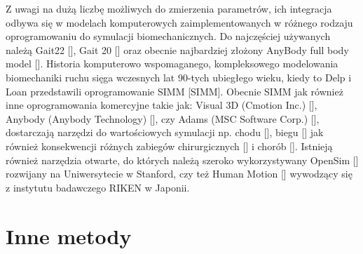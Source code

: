 Z uwagi na dużą liczbę możliwych do zmierzenia parametrów, ich integracja odbywa się w modelach komputerowych zaimplementowanych w różnego rodzaju oprogramowaniu do symulacji biomechanicznych. Do najczęściej używanych należą Gait22 [], Gait 20 [] oraz obecnie najbardziej złożony AnyBody full body model []. Historia komputerowo wspomaganego, kompleksowego modelowania biomechaniki ruchu sięga wczesnych lat 90-tych ubiegłego wieku, kiedy to Delp i Loan przedstawili oprogramowanie SIMM [SIMM]. Obecnie SIMM jak również inne oprogramowania komercyjne takie jak: Visual 3D (Cmotion Inc.) [], Anybody (Anybody Technology) [], czy Adams (MSC Software Corp.) [], dostarczają narzędzi do wartościowych symulacji np. chodu [], biegu [] jak również konsekwencji różnych zabiegów chirurgicznych [] i chorób []. Istnieją również narzędzia otwarte, do których należą szeroko wykorzystywany OpenSim [] rozwijany na Uniwersytecie w Stanford, czy też Human Motion [] wywodzący się z instytutu badawczego RIKEN w Japonii.


\section{Inne metody}